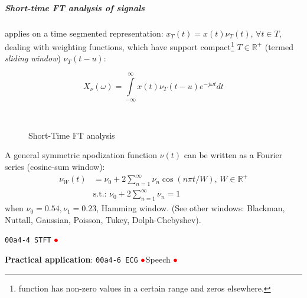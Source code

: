 \documentclass[17pt,a4paper]{extarticle}
\newcommand{\Real}{\mathbb{R}}\newcommand{\N}{\mathbb{N}}
\newcommand{\gc}[1]{\textcolor[rgb]{1.00,0.00,0.00}{#1}}
\newcommand{\alp}[1]{\textcolor[rgb]{0.00,0.00,1.00}{\small\texttt{#1}}}
\begin{document}
\subparagraph{Short-time FT analysis of signals} applies on a time segmented representation: $x_T(t){=} x(t)\nu_T(t),\,\forall t{\in} T$, dealing with weighting functions, which have support compact\footnote{ function has non-zero values in a certain range and zeros elsewhere.} $T{\in} \Real^{+}$ (termed \textit{sliding window}) $\nu_T(t-u)$:
\begin{linenomath*}\begin{equation*}
	X_\nu(\omega)={\displaystyle\int\limits_{-\infty}^{\infty}} x(t)\nu_T(t-u)e^{-j\omega 
		t}dt
	\end{equation*}\end{linenomath*}
\clearpage
\begin{wrapfigure}{r}{.51\textwidth}
	\centering
	\\
	\caption{Short-Time FT analysis}\label{Fig:ST-F}	
\end{wrapfigure}
A general symmetric apodization function $\nu(t)$ can be written as a Fourier series (cosine-sum window):
\begin{align*}
\nu_W(t)&= \nu_0+2\sum_{n=1}^\infty{\nu_n \cos(n \pi t/W)},\, W\in\Real^{+}\\
&\textrm{s.t.: } \nu_0+2\sum_{n=1}^\infty{\nu_n }=1
\end{align*}
when $\nu_0{=} 0.54,\nu_1{=}0.23$, Hamming window. (See other windows: Blackman, Nuttall, Gaussian, Poisson, Tukey, Dolph-Chebyshev). 

\alp{00a4-4 STFT}
\href{https://deepnote.com/workspace/gcpds-76307f69-c109-4b50-8818-29b8600ffe98/project/Fundamentals-ef1064c8-5ffe-4039-a3f4-6f71bb3de118/notebook/00a4-4%20STFT-f395c565415a412bb205a4b0b60bdd04}{$\gc{\bullet}$}

\textbf{Practical application}: \alp{00a4-6 ECG}
\href{https://deepnote.com/workspace/gcpds-76307f69-c109-4b50-8818-29b8600ffe98/project/Fundamentals-ef1064c8-5ffe-4039-a3f4-6f71bb3de118/notebook/00a4-6%20ECG-cf4a9a2815f1422dbb7ef0f3e96efed6}{$\gc{\bullet}$}Speech
\href{https://towardsdatascience.com/understanding-audio-data-fourier-transform-fft-spectrogram-and-speech-recognition-a4072d228520}{$\gc{\bullet}$}
\end{document}
